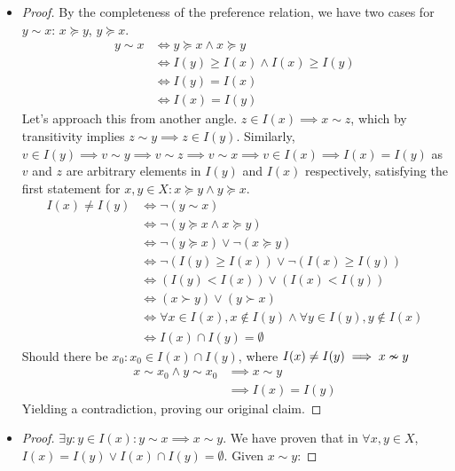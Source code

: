 \documentclass{article}
\begin{document}
\begin{itemize}
    \item 
\begin{proof}
By the completeness of the preference relation, we have two cases for $y\sim x$: $x\succeq y$, $y\succeq x$.
\begin{align}
        y\sim x & \Longleftrightarrow y\succeq x \wedge x \succeq y\\ & \Longleftrightarrow I(y)\geq I(x) \wedge I(x) \geq I(y)\\& \Longleftrightarrow I(y)=I(x)  \\ &\Longleftrightarrow  I(x)=I(y) 
    \end{align}
Let's approach this from another angle. $z\in I(x)\implies x\sim z$, which by transitivity implies $z\sim y\implies z\in I(y)$. Similarly, $v\in I(y)\implies v\sim y\implies v\sim z\implies v\sim x \implies v\in I(x) \implies I(x)=I(y)$ as $v$ and $z$ are arbitrary elements in $I(y)$ and $I(x)$ respectively, satisfying the first statement for $x, y \in X: x\succeq y \land y\succeq x$.  
\begin{align}
        I(x)\neq I(y) & \Longleftrightarrow\neg(y\sim x)\\  & \Longleftrightarrow \neg (y\succeq x \wedge x \succeq y)\\ &\Longleftrightarrow \neg (y\succeq x) \lor \neg (x \succeq y)\\ &\Longleftrightarrow \neg (I(y)\geq I(x)) \lor \neg (I(x) \geq I(y))\\ &\Longleftrightarrow  (I(y)< I(x)) \lor  (I(x) < I(y))\\ &\Longleftrightarrow (x\succ y) \lor (y\succ x)\\ &\Longleftrightarrow \forall x\in I(x), x\not \in  I(y) \land \forall y \in I(y), y \not \in I(x) \\ &\Longleftrightarrow I(x)\cap I(y)=\emptyset
\end{align}
Should there be $x_0: x_0\in I(x)\cap I(y)$, where $I(x)\neq I(y) \implies x\nsim y\\ $
\begin{align}
    x\sim x_0 \land y\sim x_0 &\implies x\sim y\\ &\implies I(x)=I(y)
\end{align}
Yielding a contradiction, proving our original claim. 
\end{proof}
\item \begin{proof}
$\exists y: y \in I(x): y\sim x\implies x \sim y$. We have proven that in  $\forall x, y \in X$, $I(x)=I(y)\lor I(x)\cap I(y)=\emptyset$.  Given $x\sim y$:

\end{proof}
\end{itemize}
\end{document}
